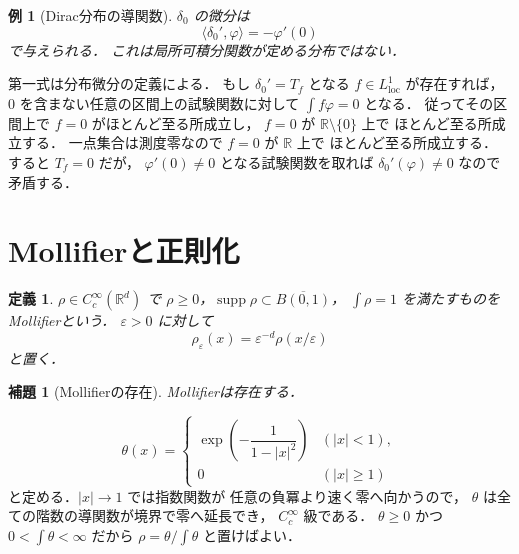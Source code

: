 \documentclass[a5paper,10pt,onecolumn]{jsarticle}
\makeatletter
\theoremstyle{mathnotetheorem}
\newtheorem{definition}[theorem]{定義}
\newtheorem{lemma}[theorem]{補題}
\newtheorem{example}[theorem]{例}
\renewcommand{\proofname}{証明}
\renewenvironment{proof}[1][\proofname]{%
  \par\pushQED{\qed}\normalfont\topsep4\p@\@plus2\p@\relax
  \trivlist\item[\hskip\labelsep\bfseries #1]\ignorespaces
}{\popQED\endtrivlist\@endpefalse}
\makeatother
\begin{document}
\begin{example}[Dirac分布の導関数]
$\delta_0$ の微分は
\[
 \langle\delta_0',\varphi\rangle=-\varphi'(0)
\]
で与えられる．
これは局所可積分関数が定める分布ではない．
\end{example}
\begin{proof}
第一式は分布微分の定義による．
もし $\delta_0'=T_f$ となる
$f\in L^1_{\mathrm{loc}}$ が存在すれば，
$0$ を含まない任意の区間上の試験関数に対して
$\int f\varphi=0$ となる．
従ってその区間上で $f=0$ がほとんど至る所成立し，
$f=0$ が $\mathbb R\setminus\{0\}$ 上で
ほとんど至る所成立する．
一点集合は測度零なので $f=0$ が $\mathbb R$ 上で
ほとんど至る所成立する．
すると $T_f=0$ だが，
$\varphi'(0)\ne0$ となる試験関数を取れば
$\delta_0'(\varphi)\ne0$ なので矛盾する．
\end{proof}

\section{Mollifierと正則化}

\begin{definition}
$\rho\in C_c^\infty(\mathbb R^d)$ で
$\rho\ge0$，$\operatorname{supp}\rho\subset\overline{B(0,1)}$，
$\int\rho=1$ を満たすものをMollifierという．
$\varepsilon>0$ に対して
\[
 \rho_\varepsilon(x)=\varepsilon^{-d}\rho(x/\varepsilon)
\]
と置く．
\end{definition}

\begin{lemma}[Mollifierの存在]\label{lem:mollifier}
Mollifierは存在する．
\end{lemma}
\begin{proof}
\[
 \theta(x)=
 \begin{cases}
 \exp\!\left(-\dfrac1{1-|x|^2}\right)&(|x|<1),\\
 0&(|x|\ge1)
 \end{cases}
\]
と定める．$|x|\to1$ では指数関数が
任意の負冪より速く零へ向かうので，
$\theta$ は全ての階数の導関数が境界で零へ延長でき，
$C_c^\infty$ 級である．
$\theta\ge0$ かつ
$0<\int\theta<\infty$ だから
$\rho=\theta/\int\theta$ と置けばよい．
\end{proof}
\end{document}
